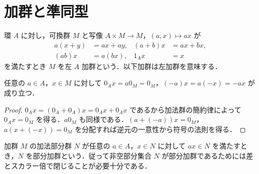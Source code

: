 \section{加群と準同型}
\begin{defn}[左加群]
環 $A$ に対し，可換群 $M$ と写像 $A\times M\to M$，$(a,x)\mapsto ax$ が
\[
\begin{aligned}
a(x+y)&=ax+ay,&(a+b)x&=ax+bx,\\
(ab)x&=a(bx),&1_Ax&=x
\end{aligned}
\]
を満たすとき $M$ を左 $A$ 加群という．以下加群は左加群を意味する．
\end{defn}
\begin{prop}[加群の零元と符号]
任意の $a\in A$，$x\in M$ に対して $0_Ax=a0_M=0_M$，$(-a)x=a(-x)=-ax$ が成り立つ．
\end{prop}
\begin{proof}
$0_Ax=(0_A+0_A)x=0_Ax+0_Ax$ であるから加法群の簡約律によって $0_Ax=0_M$ を得る．$a0_M$ も同様である．$(a+(-a))x=0_M$，$a(x+(-x))=0_M$ を分配すれば逆元の一意性から符号の法則を得る．
\end{proof}
\begin{defn}[部分加群]
加群 $M$ の加法部分群 $N$ が任意の $a\in A$，$x\in N$ に対して $ax\in N$ を満たすとき，$N$ を部分加群という．従って非空部分集合 $N$ が部分加群であるためには差とスカラー倍で閉じることが必要十分である．
\end{defn}
